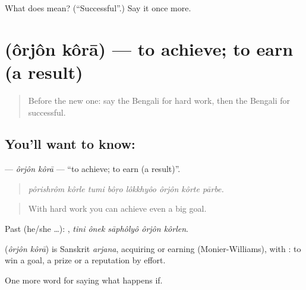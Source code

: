 \begin{tcolorbox}[breakable,colback=teal!4,colframe=teal!35!black,title={Before you move on}]
What does  mean? (\textquotedblleft{}Successful\textquotedblright{}.) Say it once more.
\end{tcolorbox}
\section[\texorpdfstring{\bn{অর্জন} \bn{করা} (ôrjôn kôrā)}{অর্জন করা (ôrjôn kôrā)}]{  (ôrjôn kôrā) — to achieve; to earn (a result)}

\label{lesson:BN-C376-orjon-kora}



\begin{quote}
Before the new one: say the Bengali for hard work, then the Bengali for successful.
\end{quote}

\subsection*{You'll want to know:  }
\textbf{ } — \emph{ôrjôn kôrā} — \textquotedblleft{}to achieve; to earn (a result)\textquotedblright{}.

\begin{quote}
       
\end{quote}

\begin{quote}
\emph{pôrishrôm kôrle tumi bôṛo lôkkhyôo ôrjôn kôrte pārbe.}
\end{quote}

\begin{quote}
With hard work you can achieve even a big goal.
\end{quote}

Past (he/she …):     , \emph{tini ônek sāphôlyô ôrjôn kôrlen}.

\begin{cousinweb}
\textbf{ } (\emph{ôrjôn kôrā}) is Sanskrit \emph{arjana}, acquiring or earning (Monier-Williams), with : to win a goal, a prize or a reputation by effort.
\end{cousinweb}

\begin{grammarlens}[title={What you've built}]
One more word for saying what happens if.
\end{grammarlens}

